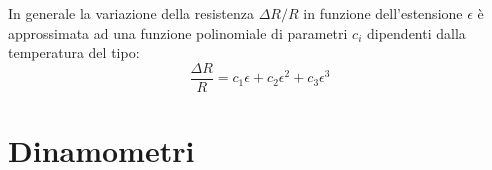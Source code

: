 		In generale la variazione della resistenza $\Delta R/R$ in funzione dell'estensione $\epsilon$ è approssimata ad una funzione polinomiale di parametri $c_i$ dipendenti dalla temperatura del tipo:
		\[ \frac{\Delta R}{R} = c_1\epsilon + c_2 \epsilon^2 + c_3 \epsilon^3  \]
		
\section{Dinamometri}
		
		
		
		
		
		
		
		
		
		
		
		
		
		
		
		
		
		
		
		
		
		
		
		
		
		
		
		
		